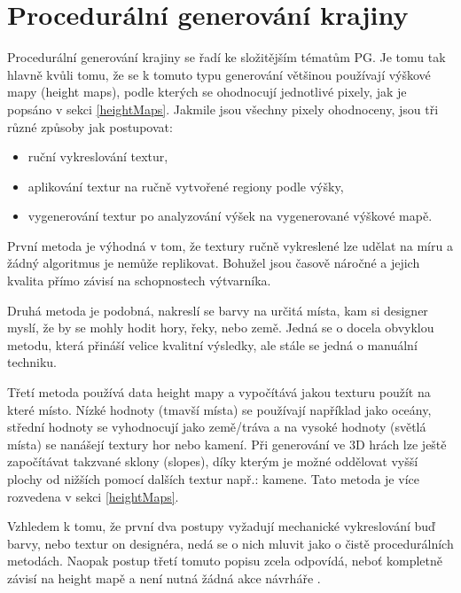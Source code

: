 \chapter{Procedurální generování krajiny}
\label{terrain}
Procedurální generování krajiny se řadí ke složitějším tématům PG. Je tomu tak hlavně kvůli tomu, že se k tomuto typu generování většinou používají výškové mapy (height maps), podle kterých se ohodnocují jednotlivé pixely, jak je popsáno v sekci \ref{heightMaps}. Jakmile jsou všechny pixely ohodnoceny, jsou tři různé způsoby jak postupovat:
\begin{itemize}
	\item ruční vykreslování textur,
	\item aplikování textur na ručně vytvořené regiony podle výšky,
	\item vygenerování textur po analyzování výšek na vygenerované výškové mapě.
\end{itemize}
První metoda je výhodná v tom, že textury ručně vykreslené lze udělat na míru a žádný algoritmus je nemůže replikovat. Bohužel jsou časově náročné a jejich kvalita přímo závisí na schopnostech výtvarníka.

Druhá metoda je podobná, nakreslí se barvy na určitá místa, kam si designer myslí, že by se mohly hodit hory, řeky, nebo země. Jedná se o docela obvyklou metodu, která přináší velice kvalitní výsledky, ale stále se jedná o manuální techniku.

Třetí metoda používá data height mapy a vypočítává jakou texturu použít na které místo. Nízké hodnoty (tmavší místa) se používají například jako oceány, střední hodnoty se vyhodnocují jako země/tráva a na vysoké hodnoty (světlá místa) se nanášejí textury hor nebo kamení. Při generování ve 3D hrách lze ještě započítávat takzvané sklony (slopes), díky kterým je možné oddělovat vyšší plochy od nižších pomocí dalších textur např.: kamene. Tato metoda je více rozvedena v sekci \ref{heightMaps}.

Vzhledem k tomu, že první dva postupy vyžadují mechanické vykreslování buď barvy, nebo textur on designéra, nedá se o nich mluvit jako o čistě procedurálních metodách. Naopak postup třetí tomuto popisu zcela odpovídá, neboť kompletně závisí na height mapě a není nutná žádná akce návrháře \cite{madoc59000}.

